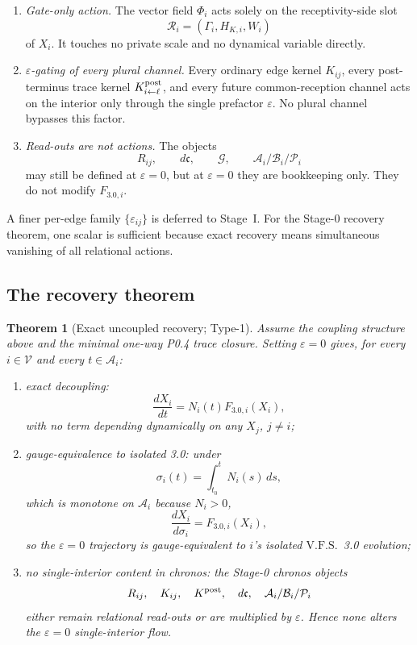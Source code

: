 \documentclass[11pt,a4paper]{article}
\newcommand{\VFS}{\ensuremath{\mathrm{V.F.S.}}}
\theoremstyle{definition}
\theoremstyle{plain}
\newtheorem{theorem}[definition]{Theorem}
\theoremstyle{remark}
\begin{document}
\begin{enumerate}[label=\textup{(\roman*)},leftmargin=1.2cm]
\item \emph{Gate-only action.}
The vector field \(\Phi_i\) acts solely on the receptivity-side slot
\[
\mathcal R_i=(\Gamma_i,H_{K,i},W_i)
\]
of \(X_i\). It touches no private scale and no dynamical variable directly.

\item \emph{\(\varepsilon\)-gating of every plural channel.}
Every ordinary edge kernel \(K_{ij}\), every post-terminus trace kernel
\(K^{\rm post}_{i\leftarrow\ell}\), and every future common-reception channel
acts on the interior only through the single prefactor \(\varepsilon\). No plural
channel bypasses this factor.

\item \emph{Read-outs are not actions.}
The objects
\[
R_{ij},
\qquad
d\mathfrak c,
\qquad
\mathcal G,
\qquad
\mathcal A_i/\mathcal B_i/\mathcal P_i
\]
may still be defined at \(\varepsilon=0\), but at \(\varepsilon=0\) they are
bookkeeping only. They do not modify \(F_{3.0,i}\).
\end{enumerate}

A finer per-edge family \(\{\varepsilon_{ij}\}\) is deferred to Stage~I. For the
Stage-0 recovery theorem, one scalar is sufficient because exact recovery means
simultaneous vanishing of all relational actions.

\subsection{The recovery theorem}

\begin{theorem}[Exact uncoupled recovery; Type-1]\label{thm:recovery}
Assume the coupling structure above and the minimal one-way P0.4 trace closure.
Setting \(\varepsilon=0\) gives, for every \(i\in\mathcal V\) and every
\(t\in\mathcal A_i\):
\begin{enumerate}[label=\textup{(\alph*)},leftmargin=1.2cm]
\item \emph{exact decoupling}:
\[
\frac{dX_i}{dt}
=
N_i(t)F_{3.0,i}(X_i),
\]
with no term depending dynamically on any \(X_j\), \(j\neq i\);

\item \emph{gauge-equivalence to isolated 3.0}: under
\[
\sigma_i(t)=\int_{t_0}^{t}N_i(s)\,ds,
\]
which is monotone on \(\mathcal A_i\) because \(N_i>0\),
\[
\frac{dX_i}{d\sigma_i}
=
F_{3.0,i}(X_i),
\]
so the \(\varepsilon=0\) trajectory is gauge-equivalent to \(i\)'s isolated
\VFS\ 3.0 evolution;

\item \emph{no single-interior content in chronos}: the Stage-0 chronos objects
\[
R_{ij},\quad
K_{ij},\quad
K^{\rm post},\quad
d\mathfrak c,\quad
\mathcal A_i/\mathcal B_i/\mathcal P_i
\]
either remain relational read-outs or are multiplied by \(\varepsilon\). Hence
none alters the \(\varepsilon=0\) single-interior flow.
\end{enumerate}
\end{theorem}
\end{document}

